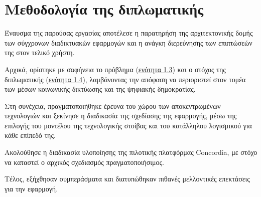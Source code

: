 \section{Μεθοδολογία της διπλωματικής}\label{section:1-5-methodology}

Έναυσμα της παρούσας εργασίας αποτέλεσε η παρατηρήση της αρχιτεκτονικής δομής των σύγχρονων διαδικτυακών εφαρμογών και η ανάγκη διερεύνησης των επιπτώσεών της στον τελικό χρήστη. 

Αρχικά, ορίστηκε με σαφήνεια το πρόβλημα (\hyperref[section:1-3-problem-definition]{ενότητα 1.3}) και ο στόχος της διπλωματικής (\hyperref[section:1-4-thesis-goal]{ενότητα 1.4}), λαμβάνοντας την απόφαση να περιοριστεί στον τομέα των μέσων κοινωνικής δικτύωσης και της ψηφιακής δημοκρατίας.

Στη συνέχεια, πραγματοποιήθηκε έρευνα του χώρου των αποκεντρωμένων τεχνολογιών και ξεκίνησε η διαδικασία της σχεδίασης της εφαρμογής, μέσω της επιλογής του μοντέλου της τεχνολογικής στοίβας και του κατάλληλου λογισμικού για κάθε επίπεδό της.

Ακολούθησε η διαδικασία υλοποίησης της πιλοτικής πλατφόρμας Concordia, με στόχο να καταστεί ο αρχικός σχεδιασμός πραγματοποιήσιμος.

Τέλος, εξήχθησαν συμπεράσματα και διατυπώθηκαν πιθανές μελλοντικές επεκτάσεις για την εφαρμογή.
